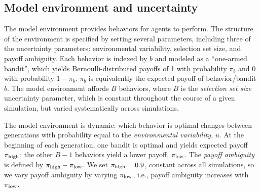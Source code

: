 \documentclass[letterpaper,11.5pt]{scrartcl}
\begin{document}
\subsection{Model environment and uncertainty}

The model environment provides behaviors for agents to perform. The structure
of the environment is specified by setting several parameters, including
three of the uncertainty parameters: environmental variability, selection set size, 
and payoff ambiguity. 
Each behavior is indexed by $b$ and modeled as a ``one-armed bandit'', which yields 
Bernoulli-distributed payoffs of 1 with probability $\pi_b$ and 0 with 
probability $1 - \pi_b$. $\pi_b$ is equivalently the expected
payoff of behavior/bandit $b$. The model environment affords $B$ behaviors, where
$B$ is the \emph{selection set size} uncertainty parameter, which
is constant throughout the course of a given simulation, but varied systematically
across simulations. 

The model environment is dynamic: which behavior is optimal changes between
generations with probability equal to the \emph{environmental variability}, $u$.
At the beginning of each generation, one bandit is optimal and yields expected
payoff $\pi_{\mathrm{high}}$; the other $B-1$ behaviors yield a lower payoff, $\pi_{\mathrm{low}}$. 
The \emph{payoff ambiguity} is defined by $\pi_{\mathrm{high}} - \pi_{\mathrm{low}}$. 
We set $\pi_{\mathrm{high}} = 0.9$, constant across all simulations, so we vary
payoff ambiguity by varying $\pi_{\mathrm{low}}$, i.e., payoff ambiguity increases with
$\pi_{\mathrm{low}}$.  
\end{document}
